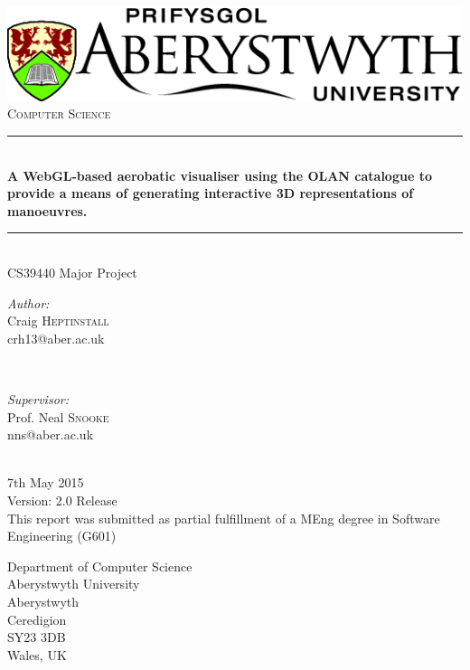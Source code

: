 \begin{titlepage}

\newcommand{\HRule}{\rule{\linewidth}{0.5mm}} %

\begin{center} %

\includegraphics[scale=0.5]{images/logo.png}\\[0.6cm] %

\textsc{\Large Computer Science}\\[0.5cm] %

\HRule \\[0.4cm]
{ \huge \bfseries A WebGL-based aerobatic visualiser using the OLAN catalogue to provide a means of generating interactive 3D representations of manoeuvres. } %
\HRule \\[0.6cm]

\huge{ CS39440 Major Project }\\[1cm]

\begin{minipage}{0.4\textwidth}
\begin{flushleft} \large
\emph{Author:}\\
Craig \textsc{Heptinstall} %
\\ crh13@aber.ac.uk
\end{flushleft}
\end{minipage}
~
\begin{minipage}{0.4\textwidth}
\begin{flushright} \large
\emph{Supervisor:} \\
Prof. Neal \textsc{Snooke} %
\\ nns@aber.ac.uk
\end{flushright}
\end{minipage}\\[1.5cm]
{\large {7th May 2015}}\\ 
{\large {Version: 2.0 Release}}\\[1cm] 
{\large{This report was submitted as partial fulfillment of a MEng degree in Software Engineering (G601)}}\\[3.2cm]

\end{center}

{\large {Department of Computer Science}}\\ 
{\large {Aberystwyth University}}\\ 
{\large {Aberystwyth}}\\ 
{\large {Ceredigion}}\\ 
{\large {SY23 3DB}}\\ 
{\large {Wales, UK}}
\end{titlepage}